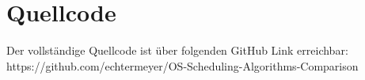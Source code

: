 \chapter{Quellcode}
Der vollständige Quellcode ist über folgenden GitHub Link erreichbar: \linebreak https://github.com/echtermeyer/OS-Scheduling-Algorithms-Comparison
